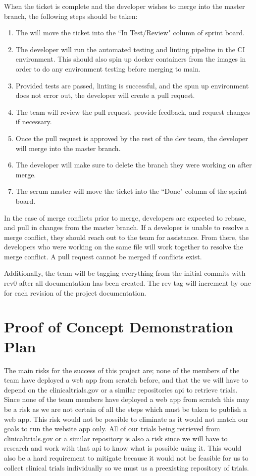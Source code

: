 \documentclass{article}
\begin{document}
When the ticket is complete and the developer wishes to merge into the master branch, the following steps should be taken:
\begin{enumerate}
	\item The will move the ticket into the ``In Test/Review" column of sprint board.
	\item The developer will run the automated testing and linting pipeline in the CI environment.
	      This should also spin up docker containers from the images in order to do any environment testing before merging to main.
	\item Provided tests are passed, linting is successful, and the spun up environment does not error out, the developer will create a pull request.
	\item The team will review the pull request, provide feedback, and request changes if necessary.
	\item Once the pull request is approved by the rest of the dev team, the developer will merge into the master branch.
	\item The developer will make sure to delete the branch they were working on after merge.
	\item The scrum master will move the ticket into the ``Done" column of the sprint board.
\end{enumerate}

In the case of merge conflicts prior to merge, developers are expected to rebase, and pull in changes from the master branch.
If a developer is unable to resolve a merge conflict, they should reach out to the team for assistance.
From there, the developers who were working on the same file will work together to resolve the merge conflict.
A pull request cannot be merged if conflicts exist.

Additionally, the team will be tagging everything from the initial commits with rev0 after all documentation has been created.
The rev tag will increment by one for each revision of the project documentation.

\section{Proof of Concept Demonstration Plan}

The main risks for the success of this project are;
none of the members of the team have deployed a web app from scratch before,
and that the we will have to depend on the clinicaltrials.gov or a similar repositories api to retrieve trials.
Since none of the team members have deployed a web app from scratch this may be a risk as we are
not certain of all the steps which must be taken to publish a web app.
This risk would not be possible to eliminate as it would not match our goals to run the website app only.
All of our trials being retrieved from clinicaltrials.gov or a similar repository is also a risk since we will have to
research and work with that api to know what is possible using it. This would also be a hard requirement to mitigate
because it would not be feasible for us to collect clinical trials individually so we must us a preexisting repository of trials.
\end{document}
